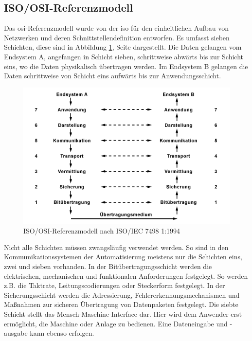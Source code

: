 \subsection{ISO/OSI-Referenzmodell}
Das \ac{osi}-Referenzmodell wurde von der \ac{iso} für den  einheitlichen Aufbau von Netzwerken und deren Schnittstellendefinition entworfen. Es umfasst sieben Schichten, diese sind in Abbildung \ref{fig:OSI}, Seite \pageref{fig:OSI} dargestellt.\autocite[vgl.][209]{Heimann2016} Die Daten gelangen vom Endsystem A, angefangen in Schicht sieben, schrittweise abwärts bis zur Schicht eins, wo die Daten physikalisch übertragen werden. Im Endsystem B gelangen die Daten schrittweise von Schicht eins aufwärts bis zur Anwendungsschicht.\autocite[vgl.][]{OSI}
\begin{figure}[H]
   \centering
    \includegraphics[scale=0.9]{Bilder/OSI-Schichtenmodell.png}
    \caption[ISO/OSI-Referenzmodell]{ISO/OSI-Referenzmodell nach ISO/IEC 7498 1:1994 \footnotemark}
    \label{fig:OSI}
\end{figure}
Nicht alle Schichten müssen zwangsläufig verwendet werden. So sind in den Kommunikationssystemen der Automatisierung meistens nur die Schichten eins, zwei und sieben vorhanden. In der Bitübertragungsschicht werden die elektrischen, mechanischen und funktionalen Anforderungen festgelegt. So werden z.B. die Taktrate, Leitungscodierungen oder Steckerform festgelegt. In der Sicherungsschicht werden die Adressierung, Fehlererkennungsmechanismen und Maßnahmen zur sicheren Übertragung von Datenpaketen festgelegt. Die siebte Schicht stellt das Mensch-Maschine-Interface dar. Hier wird dem Anwender erst ermöglicht, die Maschine oder Anlage zu bedienen. Eine Dateneingabe und -ausgabe kann ebenso erfolgen. \autocites[vgl.][209]{Heimann2016}[vgl.][]{OSI}
